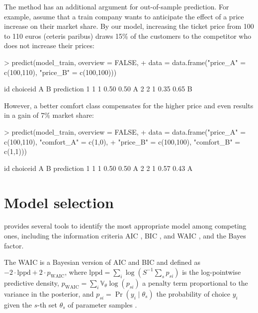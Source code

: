 \documentclass[article,shortnames]{jss}
\newcommand{\fct}[1]{\code{#1()}}
\begin{document}
The \fct{predict} method has an additional  argument for out-of-sample prediction. For example, assume that a train company wants to anticipate the effect of a price increase on their market share. By our model, increasing the ticket price from 100 to 110 euros (ceteris paribus) draws 15\% of the customers to the competitor who does not increase their prices:

\begin{Schunk}
\begin{Sinput}
> predict(model_train, overview = FALSE,
+          data = data.frame("price_A" = c(100,110), "price_B" = c(100,100)))
\end{Sinput}
\begin{Soutput}
  id choiceid    A    B prediction
1  1        1 0.50 0.50          A
2  2        1 0.35 0.65          B
\end{Soutput}
\end{Schunk}

However, a better comfort class compensates for the higher price and even results in a gain of 7\% market share:

\begin{Schunk}
\begin{Sinput}
> predict(model_train, overview = FALSE,
+          data = data.frame("price_A" = c(100,110), "comfort_A" = c(1,0),
+                            "price_B" = c(100,100), "comfort_B" = c(1,1)))
\end{Sinput}
\begin{Soutput}
  id choiceid    A    B prediction
1  1        1 0.50 0.50          A
2  2        1 0.57 0.43          A
\end{Soutput}
\end{Schunk}

\section{Model selection} \label{sec:model_selection}

 provides several tools to identify the most appropriate model among competing ones, including the information criteria AIC \citep{Akaike:1974}, BIC \citep{Schwarz:1978}, and WAIC \citep{Watanabe:2010}, and the Bayes factor.

The WAIC is a Bayesian version of AIC and BIC and defined as $-2 \cdot \text{lppd} + 2\cdot p_\text{WAIC}$, where $\text{lppd} = \sum_i \log \left( S^{-1} \sum_s p_{si} \right)$ is the log-pointwise predictive density, $p_\text{WAIC} = \sum_i \mathbb{V}_{\theta} \log (p_{si})$ a penalty term proportional to the variance in the posterior, and $p_{si} = \Pr(y_i\mid \theta_s)$ the probability of choice $y_i$ given the $s$-th set $\theta_s$ of parameter samples \citep[p.\ 220]{McElreath:2016}.
\end{document}
